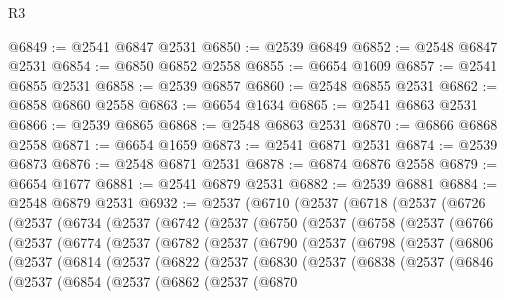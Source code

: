 \begin{lexlean}{R3}
\begin{coremodule}
@6849 := @2541 @6847 @2531
@6850 := @2539 @6849
@6852 := @2548 @6847 @2531
@6854 := @6850 @6852 @2558
@6855 := @6654 @1609
@6857 := @2541 @6855 @2531
@6858 := @2539 @6857
@6860 := @2548 @6855 @2531
@6862 := @6858 @6860 @2558
@6863 := @6654 @1634
@6865 := @2541 @6863 @2531
@6866 := @2539 @6865
@6868 := @2548 @6863 @2531
@6870 := @6866 @6868 @2558
@6871 := @6654 @1659
@6873 := @2541 @6871 @2531
@6874 := @2539 @6873
@6876 := @2548 @6871 @2531
@6878 := @6874 @6876 @2558
@6879 := @6654 @1677
@6881 := @2541 @6879 @2531
@6882 := @2539 @6881
@6884 := @2548 @6879 @2531
@6932 := @2537
    (@6710
      (@2537
        (@6718
          (@2537
            (@6726
              (@2537
                (@6734
                  (@2537
                    (@6742
                      (@2537
                        (@6750
                          (@2537
                            (@6758
                              (@2537
                                (@6766
                                  (@2537
                                    (@6774
                                      (@2537
                                        (@6782
                                          (@2537
                                            (@6790
                                              (@2537
                                                (@6798
                                                  (@2537
                                                    (@6806
                                                      (@2537
                                                        (@6814
                                                          (@2537
                                                            (@6822
                                                              (@2537
                                                                (@6830
                                                                  (@2537
                                                                    (@6838
                                                                      (@2537
                                                                        (@6846
                                                                          (@2537
                                                                            (@6854
                                                                              (@2537
                                                                                (@6862
                                                                                  (@2537
                                                                                    (@6870

\end{coremodule}
\end{lexlean}
